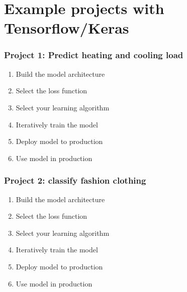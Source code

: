 \documentclass{beamer}
\def\light#1{{\color{light}#1}}
\begin{document}
\section{Example projects with Tensorflow/Keras}
\begin{frame}
\frametitle{Project 1: Predict heating and cooling load}
\begin{example}
\begin{enumerate}
\item Build the model architecture 
\item Select the loss function
\item Select your learning algorithm
\item Iteratively train the model
\item \light{Deploy model to production}
\item \light{Use model in production}
\end{enumerate}
\end{example}
\end{frame}

\begin{frame}
\frametitle{Project 2: classify fashion clothing}
\begin{example}
\begin{enumerate}
\item Build the model architecture 
\item Select the loss function
\item Select your learning algorithm
\item Iteratively train the model
\item \light{Deploy model to production}
\item \light{Use model in production}
\end{enumerate}
\end{example}
\end{frame}
\end{document}
